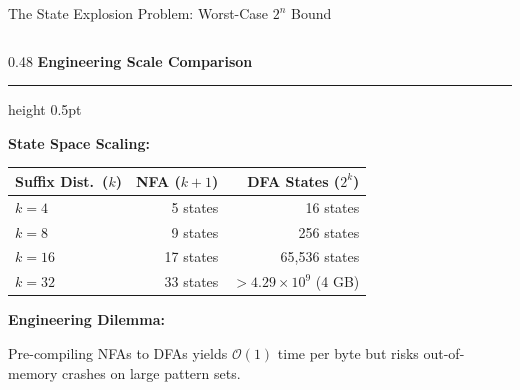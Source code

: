 \documentclass[aspectratio=169, 10pt]{beamer}
\newcommand{\colheader}[1]{%
  {\noindent\footnotesize\bfseries\color{gimpanavy}#1}%
  \vspace{0.02cm}%
  {\color{gimpanavy!30}\hrule height 0.5pt}%
  \vspace{0.05cm}%
}
\newcommand{\alerttitle}[1]{{\noindent\footnotesize\bfseries\color{accentCrimson}#1}\par\vspace{0.03cm}}
\newcommand{\greentitle}[1]{{\noindent\footnotesize\bfseries\color{accentGreen}#1}\par\vspace{0.03cm}}
\begin{document}
\begin{frame}{The State Explosion Problem: Worst-Case $2^n$ Bound}
\begin{columns}[T]
    \begin{column}{0.48\textwidth}
      \colheader{Engineering Scale Comparison}
      \begin{tcolorbox}[examplecard]
        \greentitle{State Space Scaling:}
        \vspace{0.02cm}
        {\scriptsize
        \begin{tabular}{@{} l r r @{}}
          \toprule
          \textbf{Suffix Dist.\ ($k$)} & \textbf{NFA ($k+1$)} & \textbf{DFA States ($2^k$)} \\
          \midrule
          $k = 4$ & 5 states & 16 states \\
          $k = 8$ & 9 states & 256 states \\
          $k = 16$ & 17 states & 65,536 states \\
          $k = 32$ & 33 states & $> 4.29 \times 10^9$ (4 GB) \\
          \bottomrule
        \end{tabular}
        }
      \end{tcolorbox}
      \begin{tcolorbox}[alertcard]
        \alerttitle{Engineering Dilemma:}
        {\scriptsize
        Pre-compiling NFAs to DFAs yields $\mathcal{O}(1)$ time per byte but risks out-of-memory crashes on large pattern sets.
        }
      \end{tcolorbox}
    \end{column}
  \end{columns}
\end{frame}
\end{document}

